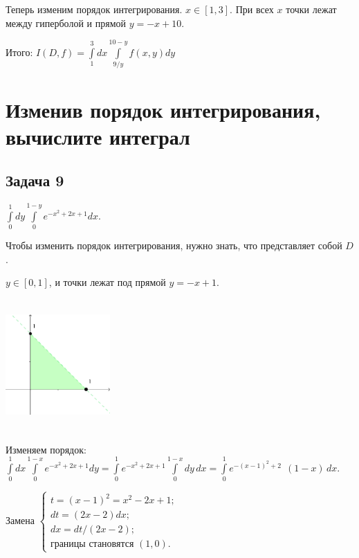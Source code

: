 \documentclass[a4paper, fleqn]{article}
\begin{document}
    Теперь изменим порядок интегрирования. $x \in [1, 3].$ При всех $x$ точки лежат между гиперболой и прямой $y = -x + 10.$
    
    Итого: $I(D, f) = \int\limits_{1}^{3} dx \int\limits_{9/y}^{10 - y} f(x, y) dy$
    
    
    \section*{Изменив порядок интегрирования, вычислите интеграл}
    
    \subsection*{Задача 9}
    
    $\int\limits_{0}^{1} dy \int\limits_{0}^{1 - y} e^{-x^2 + 2x + 1} dx.$
    
    Чтобы изменить порядок интегрирования, нужно знать, что представляет собой $D$.
    
    $y \in [0,1]$, и точки лежат под прямой $y = -x + 1$.
    
    \includegraphics[width=4cm, height=5cm]{task 9.png}
    
    Изменяем порядок: $\int\limits_{0}^{1} dx \int\limits_{0}^{1 - x} e^{-x^2 + 2x + 1} dy = 
    \int\limits_{0}^{1} e^{-x^2 + 2x + 1}  \int\limits_{0}^{1 - x} dy \, dx =
    \int\limits_{0}^{1} e^{-(x - 1)^2 + 2} \; \, (1 - x) \, dx.$  
    
    Замена $\begin{cases}
    t = (x - 1)^2 = x^2 - 2x + 1;\\
    dt = (2x - 2)dx;\\
    dx = dt/(2x - 2);\\
    \text{границы становятся } (1, 0).
    \end{cases}$
    
\end{document}
